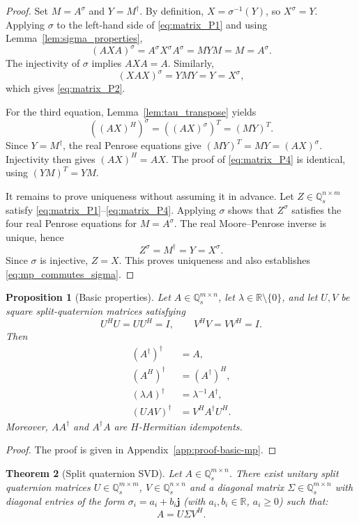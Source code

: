 \documentclass[12pt,a4paper]{article}
\theoremstyle{plain}
\newtheorem{theorem}{Theorem}[section]
\newtheorem{proposition}[theorem]{Proposition}
\theoremstyle{definition}
\theoremstyle{remark}
\newcommand{\Qs}{\mathbb{Q}_s}
\newcommand{\R}{\mathbb{R}}
\begin{document}
\begin{proof}
Set \(M=A^\sigma\) and \(Y=M^\dagger\). By definition, \(X=\sigma^{-1}(Y)\), so \(X^\sigma=Y\). Applying \(\sigma\) to the left-hand side of \eqref{eq:matrix_P1} and using Lemma~\ref{lem:sigma_properties},
\[
    (AXA)^\sigma =A^\sigma X^\sigma A^\sigma =MYM =M =A^\sigma.
\]
The injectivity of \(\sigma\) implies \(AXA=A\). Similarly,
\[
    (XAX)^\sigma=YMY=Y=X^\sigma,
\]
which gives \eqref{eq:matrix_P2}.

For the third equation, Lemma~\ref{lem:tau_transpose} yields
\[
    ((AX)^H)^\sigma =((AX)^\sigma)^T =(MY)^T.
\]
Since \(Y=M^\dagger\), the real Penrose equations give \((MY)^T=MY=(AX)^\sigma\). Injectivity then gives \((AX)^H=AX\). The proof of \eqref{eq:matrix_P4} is identical, using \((YM)^T=YM\).

It remains to prove uniqueness without assuming it in advance. Let \(Z\in\mathbb{Q}_s^{n\times m}\) satisfy \eqref{eq:matrix_P1}--\eqref{eq:matrix_P4}. Applying \(\sigma\) shows that \(Z^\sigma\) satisfies the four real Penrose equations for \(M=A^\sigma\). The real Moore--Penrose inverse is unique, hence
\[
    Z^\sigma=M^\dagger=Y=X^\sigma.
\]
Since \(\sigma\) is injective, \(Z=X\). This proves uniqueness and also establishes \eqref{eq:mp_commutes_sigma}.
\end{proof}

\begin{proposition}[Basic properties] \label{prop:mp_basic_properties}
Let \(A\in\mathbb{Q}_s^{m\times n}\), let \(\lambda\in\mathbb{R}\setminus\{0\}\), and let \(U,V\) be square split-quaternion matrices satisfying
\[
    U^HU=UU^H=I, \qquad V^HV=VV^H=I.
\]
Then
\begin{align*}
    (A^\dagger)^\dagger&=A,\\
    (A^H)^\dagger&=(A^\dagger)^H,\\
    (\lambda A)^\dagger&=\lambda^{-1}A^\dagger,\\
    (UAV)^\dagger&=V^H A^\dagger U^H.
\end{align*}
Moreover, \(AA^\dagger\) and \(A^\dagger A\) are \(H\)-Hermitian idempotents.
\end{proposition}

\begin{proof}
The proof is given in Appendix~\ref{app:proof-basic-mp}.
\end{proof}

\begin{theorem}[Split quaternion SVD] \cite{wang2024singular}
Let \( A \in \Qs^{m \times n} \). There exist unitary split quaternion matrices \( U \in \Qs^{m \times m} \), \( V \in \Qs^{n \times n} \) and a diagonal matrix \( \Sigma \in \Qs^{m \times n} \) with diagonal entries of the form \( \sigma_i = a_i + b_i\mathbf{j} \) (with \( a_i, b_i \in \R \), \( a_i \geq 0 \)) such that:
\[
    A = U \Sigma V^H.
\]
\end{theorem}
\end{document}
